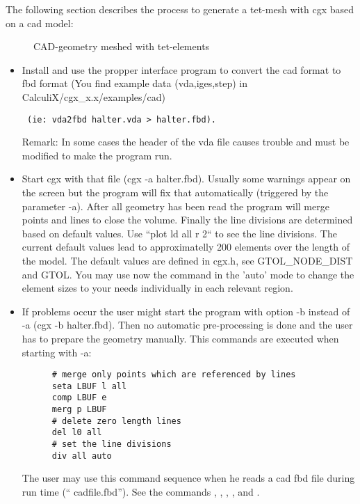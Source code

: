 \documentclass{article}
\begin{document}
\begin{appendix}
The following section describes the process to generate a tet-mesh with cgx based on a cad model:


\begin{figure}[h]
\caption{\label{halter} CAD-geometry meshed with tet-elements }
\end{figure}

\begin{itemize}

\item Install and use the propper interface program to convert the cad format to fbd format (You find example data (vda,iges,step) in CalculiX/cgx\_x.x/examples/cad)\begin{verbatim} (ie: vda2fbd halter.vda > halter.fbd). \end{verbatim} Remark: In some cases the header of the vda file causes trouble and must be modified to make the program run.

\item Start cgx with that file (cgx -a halter.fbd). Usually some warnings appear on the screen but the program will fix that automatically (triggered by the parameter -a). After all geometry has been read the program will merge points and lines to close the volume. Finally the line divisions are determined based on default values. Use ``plot ld all r 2`` to see the line divisions. The current default values lead to approximatelly 200 elements over the length of the model. The default values are defined in cgx.h, see GTOL\_NODE\_DIST and GTOL. You may use now the command  in the 'auto' mode to change the element sizes to your needs individually in each relevant region.

\item If problems occur the user might start the program with option -b instead of -a (cgx -b halter.fbd). Then no automatic pre-processing is done and the user has to prepare the geometry manually. This commands are executed when starting with -a:
\begin{verbatim}
      # merge only points which are referenced by lines
      seta LBUF l all
      comp LBUF e
      merg p LBUF
      # delete zero length lines
      del l0 all
      # set the line divisions
      div all auto
\end{verbatim}
The user may use this command sequence when he reads a cad fbd file during run time (`` cadfile.fbd''). See the commands , , , ,  and .


\end{itemize}
\end{appendix}
\end{document}
